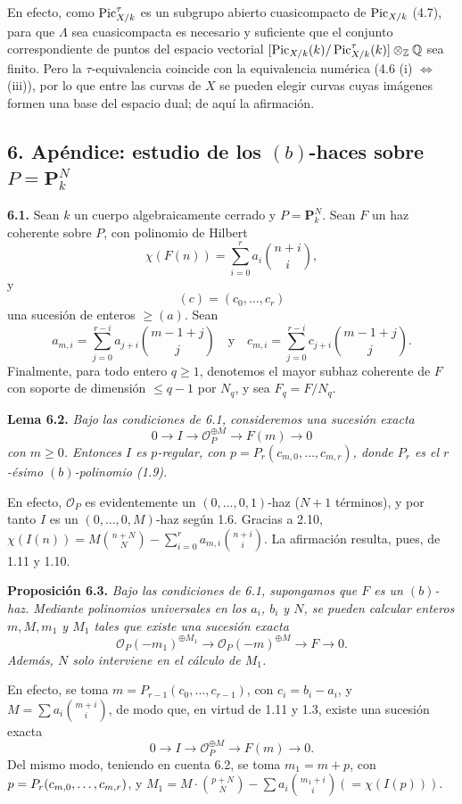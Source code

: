 En efecto, como $\Pic^\tau_{X/k}$ es un subgrupo abierto cuasicompacto de
$\Pic_{X/k}$ (4.7), para que $\Lambda$ sea cuasicompacta es necesario y
suficiente que el conjunto correspondiente de puntos del espacio vectorial
$[\Pic_{X/k}(k)/\Pic^\tau_{X/k}(k)]\otimes_\Z\Q$ sea finito. Pero la
$\tau$-equivalencia coincide con la equivalencia numérica
(4.6 (i) $\Longleftrightarrow$ (iii)), por lo que entre las curvas de $X$ se
pueden elegir curvas cuyas imágenes formen una base del espacio dual; de
aquí la afirmación.

\subsection*{6. Apéndice: estudio de los $(b)$-haces sobre
$P=\mathbf P^N_k$}

\textbf{6.1.} Sean $k$ un cuerpo algebraicamente cerrado y
$P=\mathbf P^N_k$. Sean $F$ un haz coherente sobre $P$, con polinomio de
Hilbert
\[
\chi(F(n))=\sum_{i=0}^{r}a_i\binom{n+i}{i},
\]
y
\[
(c)=(c_0,\ldots,c_r)
\]
una sucesión de enteros $\geq(a)$. Sean
\[
a_{m,i}=\sum_{j=0}^{r-i}a_{j+i}\binom{m-1+j}{j}\quad\text{y}\quad
c_{m,i}=\sum_{j=0}^{r-i}c_{j+i}\binom{m-1+j}{j}.
\]
Finalmente, para todo entero $q\geq1$, denotemos el mayor subhaz coherente de
$F$ con soporte de dimensión $\leq q-1$ por $N_q$, y sea $F_q=F/N_q$.

\textbf{Lema 6.2.} \emph{Bajo las condiciones de 6.1, consideremos una
sucesión exacta}
\[
0\longrightarrow I\longrightarrow\mathcal O_P^{\oplus M}
\longrightarrow F(m)\longrightarrow0
\]
\emph{con $m\geq0$. Entonces $I$ es $p$-regular, con
$p=P_r(c_{m,0},\ldots,c_{m,r})$, donde $P_r$ es el $r$-ésimo
$(b)$-polinomio (1.9).}

En efecto, $\mathcal O_P$ es evidentemente un $(0,\ldots,0,1)$-haz
($N+1$ términos), y por tanto $I$ es un $(0,\ldots,0,M)$-haz según 1.6.
Gracias a 2.10,
$\chi(I(n))=M\binom{n+N}{N}-
\sum_{i=0}^{r}a_{m,i}\binom{n+i}{i}$. La afirmación resulta, pues, de 1.11 y
1.10.

\textbf{Proposición 6.3.} \emph{Bajo las condiciones de 6.1, supongamos que
$F$ es un $(b)$-haz. Mediante polinomios universales en los $a_i$, $b_i$ y
$N$, se pueden calcular enteros $m,M,m_1$ y $M_1$ tales que existe una sucesión
exacta}
\[
\mathcal O_P(-m_1)^{\oplus M_1}\longrightarrow
\mathcal O_P(-m)^{\oplus M}\longrightarrow F\longrightarrow0.
\]
\emph{Además, $N$ solo interviene en el cálculo de $M_1$.}

En efecto, se toma $m=P_{r-1}(c_0,\ldots,c_{r-1})$, con $c_i=b_i-a_i$, y
$M=\sum a_i\binom{m+i}{i}$, de modo que, en virtud de 1.11 y 1.3, existe
una sucesión exacta
\[
0\longrightarrow I\longrightarrow\mathcal O_P^{\oplus M}
\longrightarrow F(m)\longrightarrow0.
\]
Del mismo modo, teniendo en cuenta 6.2, se toma $m_1=m+p$, con
$p=P_r(\sisi{a_{m,0},\ldots,a_{m,r}}{c_{m,0},\ldots,c_{m,r}})$, y
$M_1=M\cdot\binom{p+N}{N}-\sum a_i\binom{m_1+i}{i}
(=\chi(I(p)))$.

